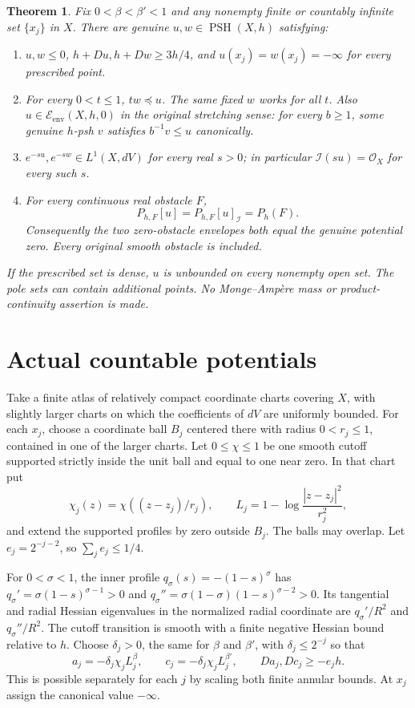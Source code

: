 \documentclass[11pt]{article}
\newtheorem{theorem}{Theorem}
\theoremstyle{remark}\newtheorem{remark}[theorem]{Remark}
\newcommand{\ddc}{D}
\newcommand{\PSH}{\operatorname{PSH}}
\newcommand{\Eenv}{\mathcal E_{\mathrm{env}}}
\newcommand{\OO}{\mathcal O_X}
\begin{document}
\begin{theorem}\label{th:main}
Fix $0<\beta<\beta'<1$ and any nonempty finite or countably infinite
set $\{x_j\}$ in $X$. There are genuine $u,w\in\PSH(X,h)$ satisfying:
\begin{enumerate}
\item $u,w\leq0$, $h+\ddc u,h+\ddc w\geq3h/4$, and
      $u(x_j)=w(x_j)=-\infty$ for every prescribed point.
\item For every $0<t\leq1$, $tw\preceq u$. The same fixed $w$
      works for all $t$. Also $u\in\Eenv(X,h,0)$ in the original
      stretching sense: for every $b\geq1$, some genuine $h$-psh
      $v$ satisfies $b^{-1}v\leq u$ canonically.
\item $e^{-su},e^{-sw}\in L^1(X,dV)$ for every real $s>0$;
      in particular $\mathcal I(su)=\OO$ for every such $s$.
\item For every continuous real obstacle $F$,
      \[
       P_{h,F}[u]=P_{h,F}[u]_{\mathcal I}=P_h(F).
      \]
      Consequently the two zero-obstacle envelopes both equal the
      genuine potential zero. Every original smooth obstacle is included.
\end{enumerate}
If the prescribed set is dense, $u$ is unbounded on every nonempty open
set. The pole sets can contain additional points. No Monge--Amp\`ere
mass or product-continuity assertion is made.
\end{theorem}

\section{Actual countable potentials}
Take a finite atlas of relatively compact coordinate charts covering $X$,
with slightly larger charts on which the coefficients of $dV$ are uniformly
bounded. For each $x_j$, choose a coordinate ball $B_j$ centered there
with radius $0<r_j\leq1$, contained in one of the larger charts. Let
$0\leq\chi\leq1$ be one smooth cutoff supported strictly inside the
unit ball and equal to one near zero. In that chart put
\[
 \chi_j(z)=\chi((z-z_j)/r_j),\qquad
 L_j=1-\log\frac{|z-z_j|^2}{r_j^2},
\]
and extend the supported profiles by zero outside $B_j$. The balls
may overlap. Let $e_j=2^{-j-2}$, so $\sum_j e_j\leq1/4$.

For $0<\sigma<1$, the inner profile $q_\sigma(s)=-(1-s)^\sigma$
has $q_\sigma'=\sigma(1-s)^{\sigma-1}>0$ and
$q_\sigma''=\sigma(1-\sigma)(1-s)^{\sigma-2}>0$.
Its tangential and radial Hessian eigenvalues in the normalized radial
coordinate are $q_\sigma'/R^2$ and $q_\sigma''/R^2$. The cutoff
transition is smooth with a finite negative Hessian bound relative to $h$.
Choose $\delta_j>0$, the same for $\beta$ and $\beta'$, with
$\delta_j\leq2^{-j}$ so that
\begin{equation}\label{eq:terms}
 a_j=-\delta_j\chi_j L_j^\beta,\qquad
 c_j=-\delta_j\chi_j L_j^{\beta'},\qquad
 \ddc a_j,\ddc c_j\geq-e_jh.
\end{equation}
This is possible separately for each $j$ by scaling both finite annular
bounds. At $x_j$ assign the canonical value $-\infty$.
\end{document}
